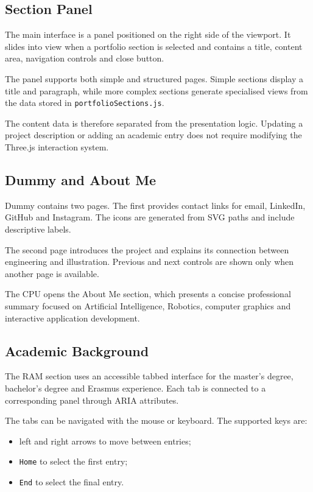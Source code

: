 \documentclass{report}
\begin{document}
\subsection{Section Panel}

The main interface is a panel positioned on the right side of the
viewport. It slides into view when a portfolio section is selected and
contains a title, content area, navigation controls and close button.

The panel supports both simple and structured pages. Simple sections
display a title and paragraph, while more complex sections generate
specialised views from the data stored in
\texttt{portfolioSections.js}.

The content data is therefore separated from the presentation logic.
Updating a project description or adding an academic entry does not
require modifying the Three.js interaction system.

\subsection{Dummy and About Me}

Dummy contains two pages. The first provides contact links for email,
LinkedIn, GitHub and Instagram. The icons are generated from SVG paths
and include descriptive labels.

The second page introduces the project and explains its connection
between engineering and illustration. Previous and next controls are
shown only when another page is available.

The CPU opens the About Me section, which presents a concise professional
summary focused on Artificial Intelligence, Robotics, computer graphics
and interactive application development.

\subsection{Academic Background}

The RAM section uses an accessible tabbed interface for the master's
degree, bachelor's degree and Erasmus experience. Each tab is connected
to a corresponding panel through ARIA attributes.

The tabs can be navigated with the mouse or keyboard. The supported keys
are:

\begin{itemize}
    \item left and right arrows to move between entries;
    \item \texttt{Home} to select the first entry;
    \item \texttt{End} to select the final entry.
\end{itemize}
\end{document}
